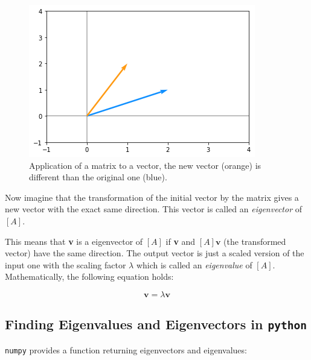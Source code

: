 \begin{figure}[htb]
	\centering
	\includegraphics[width=0.7\linewidth]{figures/matrix_transformation}
	\caption{Application of a matrix to a vector, the new vector (orange) is different than the original one (blue).}
	\label{fig:matrix_as_transform}
\end{figure}



Now imagine that the transformation of the initial vector by the matrix gives a new vector with the exact same direction. This vector is called an \emph{eigenvector} of \([A]\).

This means that \textbf{v} is a eigenvector of \([A]\) if \textbf{v} and \([A]\boldsymbol{v}\) (the transformed vector) have the same direction. The output vector is just a scaled version of the input one with the scaling factor \(\lambda\) which is called an \emph{eigenvalue} of \([A]\). Mathematically, the following equation holds:

\begin{equation}
[A]\boldsymbol{v}=\lambda \boldsymbol{v}
\end{equation}

\subsection{Finding Eigenvalues and Eigenvectors in \texttt{python}}
\label{find-eigenvalues-and-eigenvectors-in-python}

\texttt{numpy} provides a function returning eigenvectors and eigenvalues: 

